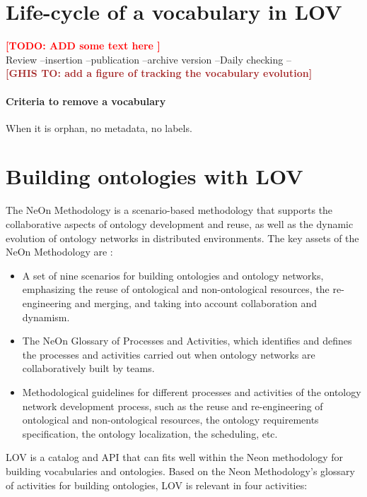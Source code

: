 \documentclass{iosart2c}
\newcommand{\TODO}[1]{\textcolor{red}{\textbf{[TODO:#1]}}}
\newcommand{\ghis}[1]{\textcolor{brown}{\textbf{[GHIS TO:#1]}}}
\begin{document}
\section{Life-cycle of a vocabulary in LOV}
\label{sec:lifecyle}

\TODO{ ADD some text here }\\
Review --insertion --publication --archive version --Daily checking --\\

\ghis{ add a figure of tracking the vocabulary evolution}
\paragraph{Criteria to remove a vocabulary} 
When it is orphan, no metadata, no labels. 


\section{Building ontologies with LOV}
\label{sec:builOnto}

The NeOn Methodology is a scenario-based methodology that supports the collaborative aspects of ontology development and reuse, as well as the dynamic evolution of ontology networks in distributed environments. The key assets of the NeOn Methodology are \cite{MC10}:
\begin{itemize}
 \item  A set of nine scenarios for building ontologies and ontology networks, emphasizing the reuse of ontological and non-ontological resources, the re-engineering and merging, and taking into account collaboration and dynamism.
 \item The NeOn Glossary of Processes and Activities, which identifies and defines the processes and activities carried out when ontology networks are collaboratively built by teams.
 \item Methodological guidelines for different processes and activities of the ontology network development process, such as the reuse and re-engineering of ontological and non-ontological resources, the ontology requirements specification, the ontology localization, the scheduling, etc.
\end{itemize}


LOV is a catalog and API that can fits well within the Neon methodology for building vocabularies and ontologies. Based on the Neon Methodology's glossary of activities for building ontologies, LOV is relevant in four activities:
\end{document}
